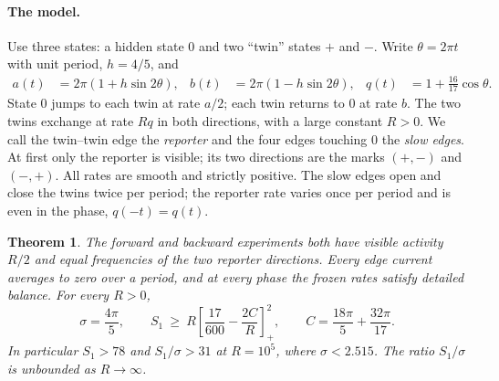 \documentclass[11pt,a4paper]{article}
\newtheorem{theorem}{Theorem}
\newcommand{\pos}[1]{\left[#1\right]_+}
\begin{document}
\paragraph{The model.} Use three states: a hidden state $0$ and two ``twin'' states $+$ and $-$. Write $\theta=2\pi t$ with unit period, $h=4/5$, and
\begin{align}
 a(t)&=2\pi(1+h\sin 2\theta),&
 b(t)&=2\pi(1-h\sin 2\theta),&
 q(t)&=1+\tfrac{16}{17}\cos\theta.\label{eq:rates}
\end{align}
State $0$ jumps to each twin at rate $a/2$; each twin returns to $0$ at rate $b$. The two twins exchange at rate $Rq$ in both directions, with a large constant $R>0$. We call the twin--twin edge the \emph{reporter} and the four edges touching $0$ the \emph{slow edges}. At first only the reporter is visible; its two directions are the marks $(+,-)$ and $(-,+)$. All rates are smooth and strictly positive. The slow edges open and close the twins twice per period; the reporter rate varies once per period and is even in the phase, $q(-t)=q(t)$.

\begin{theorem}\label{th:finite}
The forward and backward experiments both have visible activity $R/2$ and equal frequencies of the two reporter directions. Every edge current averages to zero over a period, and at every phase the frozen rates satisfy detailed balance. For every $R>0$,
\begin{equation}
  \sigma=\frac{4\pi}{5},\qquad S_1\ \geq\ R\pos{\frac{17}{600}-\frac{2C}{R}}^2,
  \qquad C=\frac{18\pi}{5}+\frac{32\pi}{17}.
\label{eq:cert}
\end{equation}
In particular $S_1>78$ and $S_1/\sigma>31$ at $R=10^5$, where $\sigma<2.515$. The ratio $S_1/\sigma$ is unbounded as $R\to\infty$.
\end{theorem}
\end{document}
